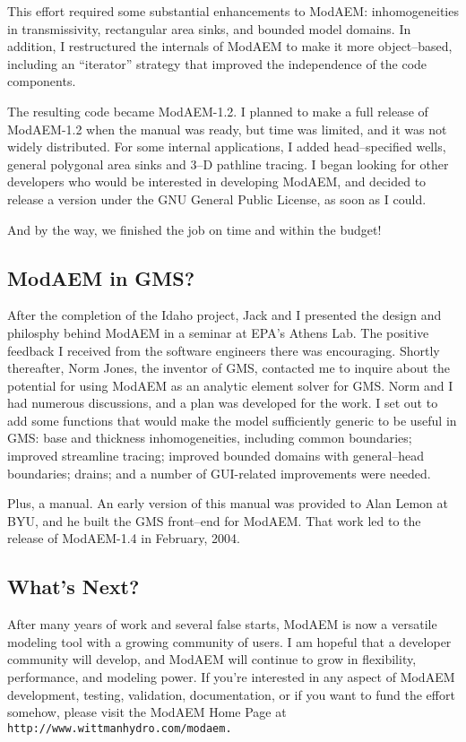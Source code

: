This effort required some substantial enhancements to ModAEM: inhomogeneities
in transmissivity, rectangular area sinks, and bounded model domains.
In addition, I restructured the internals of ModAEM to make it more
object--based, including an ``iterator'' strategy that improved
the independence of the code components.

The resulting code became ModAEM-1.2. I planned to make a full release
of ModAEM-1.2 when the manual was ready, but time was limited, and
it was not widely distributed. For some internal applications, I added
head--specified wells, general polygonal area sinks and 3--D pathline
tracing. I began looking for other developers who would be interested
in developing ModAEM, and decided to release a version under the GNU
General Public License, as soon as I could. 

And by the way, we finished the job on time and within the budget!


\subsection*{ModAEM in GMS?}

After the completion of the Idaho project, Jack and I presented the
design and philosphy behind ModAEM in a seminar at EPA's Athens Lab.
The positive feedback I received from the software engineers there
was encouraging. Shortly thereafter, Norm Jones, the inventor of GMS,
contacted me to inquire about the potential for using ModAEM as an
analytic element solver for GMS. Norm and I had numerous discussions,
and a plan was developed for the work. I set out to add some functions
that would make the model sufficiently generic to be useful in GMS:
base and thickness inhomogeneities, including common boundaries; improved
streamline tracing; improved bounded domains with general--head boundaries;
drains; and a number of GUI-related improvements were needed.

Plus, a manual. An early version of this manual was provided to Alan
Lemon at BYU, and he built the GMS front--end for ModAEM. That work
led to the release of ModAEM-1.4 in February, 2004.

\subsection*{What's Next?}

After many years of work and several false starts, ModAEM is now a
versatile modeling tool with a growing community of users. I am hopeful
that a developer community will develop, and ModAEM will continue
to grow in flexibility, performance, and modeling power. If you're
interested in any aspect of ModAEM development, testing, validation,
documentation, or if you want to fund the effort somehow, please visit
the ModAEM Home Page at \texttt{http://www.wittmanhydro.com/modaem.}


